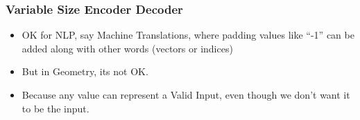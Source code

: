 



\begin{frame}[fragile]\frametitle{Variable Size Encoder Decoder}

	\begin{itemize}
	\item OK for NLP, say Machine Translations, where padding values like ``-1'' can be added along with other words (vectors or indices)
	\item But in Geometry, its not OK. 
	\item Because any value can represent a Valid Input, even though we don’t want it to be the input.
	\end{itemize}
	
\end{frame}


